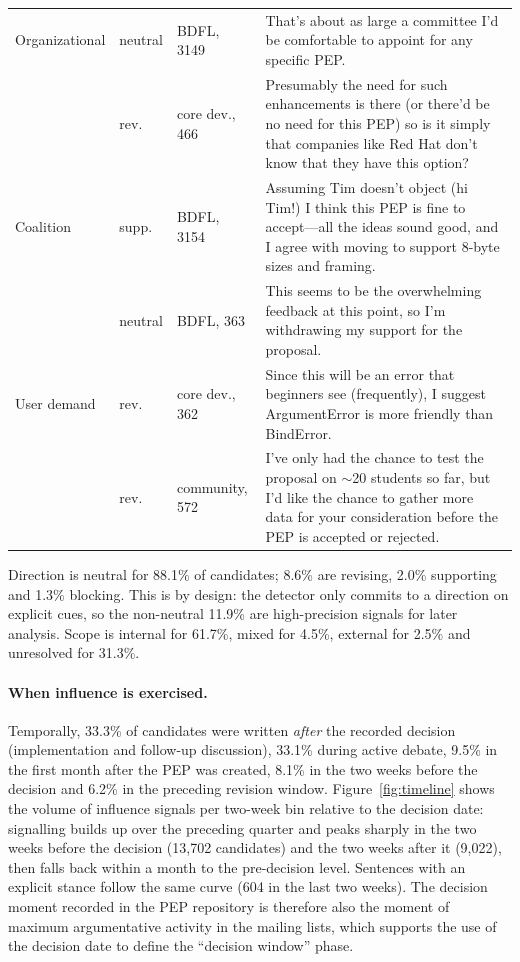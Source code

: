 \documentclass[sigconf,screen]{acmart}
\begin{document}
\begin{table}
\begin{tabular}{p{}p{}p{}p{}}
\midrule
Organizational & neutral & BDFL, 3149 & That's about as large a committee I'd be comfortable to appoint for any specific PEP. \\
 & rev. & core dev., 466 & Presumably the need for such enhancements is there (or there'd be no need for this PEP) so is it simply that companies like Red Hat don't know that they have this option? \\
\midrule
Coalition & supp. & BDFL, 3154 & Assuming Tim doesn't object (hi Tim!) I think this PEP is fine to accept---all the ideas sound good, and I agree with moving to support 8-byte sizes and framing. \\
 & neutral & BDFL, 363 & This seems to be the overwhelming feedback at this point, so I'm withdrawing my support for the proposal. \\
\midrule
User demand & rev. & core dev., 362 & Since this will be an error that beginners see (frequently), I suggest ArgumentError is more friendly than BindError. \\
 & rev. & community, 572 & I've only had the chance to test the proposal on $\sim$20 students so far, but I'd like the chance to gather more data for your consideration before the PEP is accepted or rejected. \\
\bottomrule
\end{tabular}
\end{table}

Direction is neutral for 88.1\% of candidates; 8.6\% are revising, 2.0\% supporting and 1.3\% blocking. This is by design: the detector only commits to a direction on explicit cues, so the non-neutral 11.9\% are high-precision signals for later analysis. Scope is internal for 61.7\%, mixed for 4.5\%, external for 2.5\% and unresolved for 31.3\%.

\paragraph{When influence is exercised.} Temporally, 33.3\% of candidates were written \emph{after} the recorded decision (implementation and follow-up discussion), 33.1\% during active debate, 9.5\% in the first month after the PEP was created, 8.1\% in the two weeks before the decision and 6.2\% in the preceding revision window. Figure~\ref{fig:timeline} shows the volume of influence signals per two-week bin relative to the decision date: signalling builds up over the preceding quarter and peaks sharply in the two weeks before the decision (13,702 candidates) and the two weeks after it (9,022), then falls back within a month to the pre-decision level. Sentences with an explicit stance follow the same curve (604 in the last two weeks). The decision moment recorded in the PEP repository is therefore also the moment of maximum argumentative activity in the mailing lists, which supports the use of the decision date to define the ``decision window'' phase.
\end{document}
